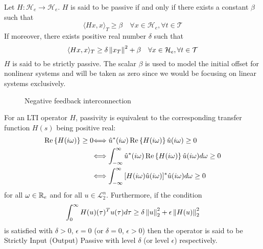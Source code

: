 \begin{define}Let $H:\mathcal{H}_e\to\mathcal{H}_e$. $H$ is said to be passive if and only if there exists a constant 
$\beta$ such that
\[
\langle Hx,x \rangle_T \geq \beta\quad \forall x\in\mathcal{H}_e,\forall t\in\mathcal{T}
\]
If moreover, there exists positive real number $\delta$ such that
\[
\langle Hx,x \rangle_T \geq \delta\displaystyle \left\| x_T \right\|^2+ \beta\quad \forall x\in\mathcal{H}_e,\forall t\in\mathcal{T}
\]
$H$ is said to be strictly passive. The scalar $\beta$ is used to model the initial offset for nonlinear systems and 
will be taken as zero since we would be focusing on linear systems exclusively. 
\end{define}


\begin{figure}%
\centering
{}
\caption{Negative feedback interconnection}%
\label{fig:apdx:passint}%
\end{figure}

\begin{define}For an LTI operator $H$, passivity is equivalent to the corresponding transfer function $H(s)$ being positive real:
\begin{align*}
{\operatorname{Re}\left\{ H(i\omega) \right\}\geq 0} &{\Longleftrightarrow
\hat{u}^*(i\omega) \operatorname{Re}\left\{ H(i\omega) \right\}\hat{u}(i\omega) \geq 0}\\
&{\Longleftrightarrow \int_{-\infty}^\infty{\hat{u}^*(i\omega)\operatorname{Re}\left\{ H(i\omega) \right\} \hat{u}(i\omega)d\omega} \geq 0}\\
&{\Longleftrightarrow \int_{-\infty}^\infty{{[H(i\omega)\hat{u}(i\omega)]^*}\hat{u}(i\omega)d\omega} \geq 0}
\end{align*}
for all $\omega\in\mathbb{R}_e$ and for all $u\in\mathcal{L}_{2}^n$. Furthermore, if the condition
\[
\int_0^\infty{H(u)(\tau)^Tu(\tau)d\tau} \geq \delta\displaystyle \left\| u \right\|_2^2 + \epsilon\displaystyle \left\| H(u) \right\|_2^2
\]
is satisfied with $\delta > 0$, $\epsilon = 0$ (or $\delta = 0$, $\epsilon > 0$) then the operator is said to be Strictly Input 
(Output) Passive with level $\delta$ (or level $\epsilon$) respectively. 
\end{define}



